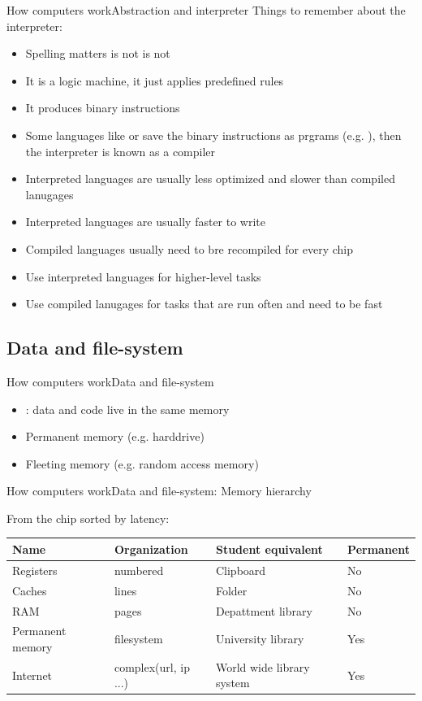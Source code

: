 \documentclass[aspectratio=169]{beamer}
\begin{document}
\begin{frame}{How computers work}{Abstraction and interpreter}
Things to remember about the interpreter:
\begin{itemize}
	\item Spelling matters  is not  is not 
	\item It is a logic machine, it just applies predefined rules
	\item It produces binary instructions
	\item Some languages like  or  save the binary instructions as prgrams (e.g. ),
		then the interpreter is known as a compiler
	\item Interpreted languages are usually less optimized and slower than compiled lanugages
	\item Interpreted languages are usually faster to write
	\item Compiled languages usually need to bre recompiled for every chip
	\item Use interpreted languages for higher-level tasks
	\item Use compiled lanugages for tasks that are run often and need to be fast
\end{itemize}
\end{frame}

\subsection{Data and file-system}
\begin{frame}{How computers work}{Data and file-system}
\begin{itemize}
	\item {}: data and code live in the same memory
	\item Permanent memory (e.g. harddrive)
	\item Fleeting memory (e.g. random access memory)
\end{itemize}
\end{frame}

\begin{frame}{How computers work}{Data and file-system: Memory hierarchy}

From the chip sorted by latency:

\vspace{2em}

\begin{tabular}{llll}
	\toprule
	Name & Organization & Student equivalent & Permanent \\
	\midrule
	Registers & numbered & Clipboard & No\\
	Caches & lines & Folder & No \\
	RAM & pages & Depattment library & No \\
	Permanent memory & filesystem & University library & Yes \\
	Internet & complex(url, ip ...) & World wide library system & Yes \\
	\bottomrule
\end{tabular}
\end{frame}
\end{document}
